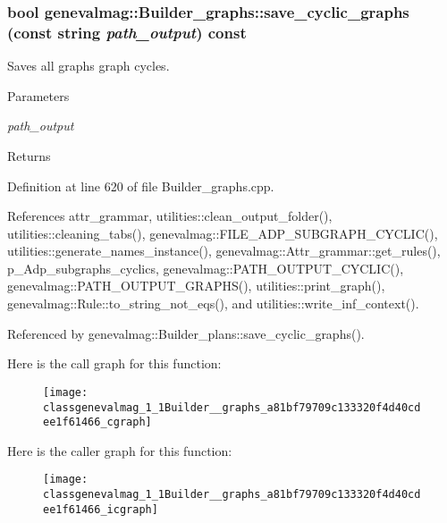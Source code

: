 \hypertarget{classgenevalmag_1_1Builder__graphs_a81bf79709c133320f4d40cdee1f61466}{
\subsubsection[{save\_\-cyclic\_\-graphs}]{\setlength{\rightskip}{0pt plus 5cm}bool genevalmag::Builder\_\-graphs::save\_\-cyclic\_\-graphs (const string {\em path\_\-output}) const}}
\label{classgenevalmag_1_1Builder__graphs_a81bf79709c133320f4d40cdee1f61466}
Saves all graphs graph cycles. 
\begin{DoxyParams}{Parameters}
\item[{\em path\_\-output}]\end{DoxyParams}
\begin{DoxyReturn}{Returns}

\end{DoxyReturn}


Definition at line 620 of file Builder\_\-graphs.cpp.



References attr\_\-grammar, utilities::clean\_\-output\_\-folder(), utilities::cleaning\_\-tabs(), genevalmag::FILE\_\-ADP\_\-SUBGRAPH\_\-CYCLIC(), utilities::generate\_\-names\_\-instance(), genevalmag::Attr\_\-grammar::get\_\-rules(), p\_\-Adp\_\-subgraphs\_\-cyclics, genevalmag::PATH\_\-OUTPUT\_\-CYCLIC(), genevalmag::PATH\_\-OUTPUT\_\-GRAPHS(), utilities::print\_\-graph(), genevalmag::Rule::to\_\-string\_\-not\_\-eqs(), and utilities::write\_\-inf\_\-context().



Referenced by genevalmag::Builder\_\-plans::save\_\-cyclic\_\-graphs().



Here is the call graph for this function:\nopagebreak
\begin{figure}[H]
\begin{center}
\leavevmode
\texttt{[image: classgenevalmag\_1\_1Builder\_\_graphs\_a81bf79709c133320f4d40cdee1f61466\_cgraph]}
\end{center}
\end{figure}




Here is the caller graph for this function:\nopagebreak
\begin{figure}[H]
\begin{center}
\leavevmode
\texttt{[image: classgenevalmag\_1\_1Builder\_\_graphs\_a81bf79709c133320f4d40cdee1f61466\_icgraph]}
\end{center}
\end{figure}


